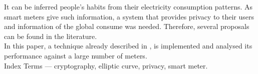 
	It can be inferred people's habits from their electricity consumption patterns. As smart meters give such information, a system that provides privacy to their users and information of the global consume was needed. Therefore, several proposals can be found in the literature.\\
	
	In this paper, a technique already described in \cite{recsi}
	, is implemented and analysed its performance against a large number of meters.\\
	Index Terms --- cryptography, elliptic curve, privacy, smart meter.
